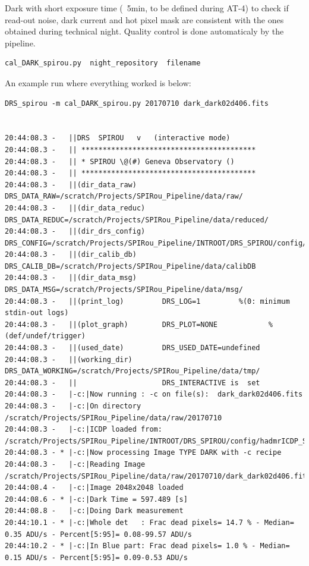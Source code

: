 Dark with short exposure time (~5min, to be defined during AT-4) to check if read-out noise, dark current and hot pixel mask are consistent with the ones obtained during technical night. Quality control is done automaticaly by the pipeline.

\begin{lstlisting}[language=bash, style=bashstyle]
cal_DARK_spirou.py  night_repository  filename
\end{lstlisting}

\noindent An example run where everything worked is below:

\begin{lstlisting}[style=text]
DRS_spirou -m cal_DARK_spirou.py 20170710 dark_dark02d406.fits


20:44:08.3 -   ||DRS  SPIROU   v   (interactive mode)
20:44:08.3 -   || *****************************************
20:44:08.3 -   || * SPIROU \@(#) Geneva Observatory ()
20:44:08.3 -   || *****************************************
20:44:08.3 -   ||(dir_data_raw)      DRS_DATA_RAW=/scratch/Projects/SPIRou_Pipeline/data/raw/
20:44:08.3 -   ||(dir_data_reduc)    DRS_DATA_REDUC=/scratch/Projects/SPIRou_Pipeline/data/reduced/
20:44:08.3 -   ||(dir_drs_config)    DRS_CONFIG=/scratch/Projects/SPIRou_Pipeline/INTROOT/DRS_SPIROU/config/
20:44:08.3 -   ||(dir_calib_db)      DRS_CALIB_DB=/scratch/Projects/SPIRou_Pipeline/data/calibDB
20:44:08.3 -   ||(dir_data_msg)      DRS_DATA_MSG=/scratch/Projects/SPIRou_Pipeline/data/msg/
20:44:08.3 -   ||(print_log)         DRS_LOG=1         %(0: minimum stdin-out logs)
20:44:08.3 -   ||(plot_graph)        DRS_PLOT=NONE            %(def/undef/trigger)
20:44:08.3 -   ||(used_date)         DRS_USED_DATE=undefined
20:44:08.3 -   ||(working_dir)       DRS_DATA_WORKING=/scratch/Projects/SPIRou_Pipeline/data/tmp/
20:44:08.3 -   ||                    DRS_INTERACTIVE is  set
20:44:08.3 -   |-c:|Now running : -c on file(s):  dark_dark02d406.fits
20:44:08.3 -   |-c:|On directory /scratch/Projects/SPIRou_Pipeline/data/raw/20170710
20:44:08.3 -   |-c:|ICDP loaded from: /scratch/Projects/SPIRou_Pipeline/INTROOT/DRS_SPIROU/config/hadmrICDP_SPIROU.py
20:44:08.3 - * |-c:|Now processing Image TYPE DARK with -c recipe
20:44:08.3 -   |-c:|Reading Image /scratch/Projects/SPIRou_Pipeline/data/raw/20170710/dark_dark02d406.fits
20:44:08.4 -   |-c:|Image 2048x2048 loaded
20:44:08.6 - * |-c:|Dark Time = 597.489 [s]
20:44:08.8 -   |-c:|Doing Dark measurement
20:44:10.1 - * |-c:|Whole det   : Frac dead pixels= 14.7 % - Median= 0.35 ADU/s - Percent[5:95]= 0.08-99.57 ADU/s
20:44:10.2 - * |-c:|In Blue part: Frac dead pixels= 1.0 % - Median= 0.15 ADU/s - Percent[5:95]= 0.09-0.53 ADU/s

\end{lstlisting}
